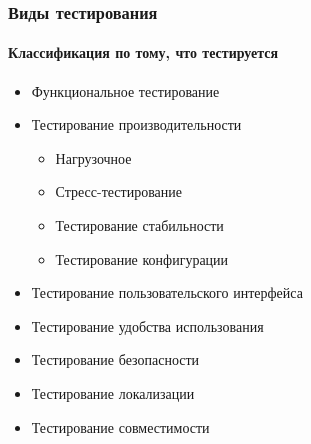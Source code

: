 \documentclass{../../slides-style}
\begin{document}
    \begin{frame}
        \frametitle{Виды тестирования}
        \framesubtitle{Классификация по тому, что тестируется}
        \begin{itemize}
            \item Функциональное тестирование
            \item Тестирование производительности
            \begin{itemize}
                \item Нагрузочное
                \item Стресс-тестирование
                \item Тестирование стабильности
                \item Тестирование конфигурации
            \end{itemize}
            \item Тестирование пользовательского интерфейса
            \item Тестирование удобства использования
            \item Тестирование безопасности
            \item Тестирование локализации
            \item Тестирование совместимости
        \end{itemize}
    \end{frame}
\end{document}

